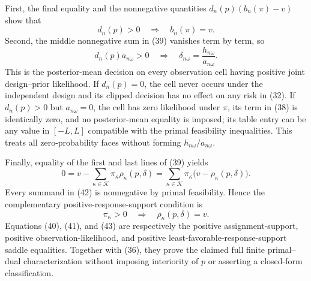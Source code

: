 First, the final equality and the nonnegative quantities \(d_n(p)(b_n(\pi)-v)\) show that
\[
 d_n(p)>0\quad\Longrightarrow\quad b_n(\pi)=v.                            \tag{40}
\]
Second, the middle nonnegative sum in (39) vanishes term by term, so
\[
 d_n(p)a_{n\omega}>0
 \quad\Longrightarrow\quad
 \delta_{n\omega}=\frac{h_{n\omega}}{a_{n\omega}}.                       \tag{41}
\]
This is the posterior-mean decision on every observation cell having positive joint design--prior likelihood.  If \(d_n(p)=0\), the cell never occurs under the independent design and its clipped decision has no effect on any risk in (32).  If \(d_n(p)>0\) but \(a_{n\omega}=0\), the cell has zero likelihood under \(\pi\), its term in (38) is identically zero, and no posterior-mean equality is imposed; its table entry can be any value in \([-L,L]\) compatible with the primal feasibility inequalities.  This treats all zero-probability faces without forming \(h_{n\omega}/a_{n\omega}\).

Finally, equality of the first and last lines of (39) yields
\[
 0=v-\sum_{\kappa\in\mathcal K}\pi_\kappa\rho_\kappa(p,\delta)
   =\sum_{\kappa\in\mathcal K}\pi_\kappa
        \bigl(v-\rho_\kappa(p,\delta)\bigr).                              \tag{42}
\]
Every summand in (42) is nonnegative by primal feasibility.  Hence the complementary positive-response-support condition is
\[
 \pi_\kappa>0
 \quad\Longrightarrow\quad
 \rho_\kappa(p,\delta)=v.                                                  \tag{43}
\]
Equations (40), (41), and (43) are respectively the positive assignment-support, positive observation-likelihood, and positive least-favorable-response-support saddle equalities.  Together with (36), they prove the claimed full finite primal--dual characterization without imposing interiority of \(p\) or asserting a closed-form classification.
